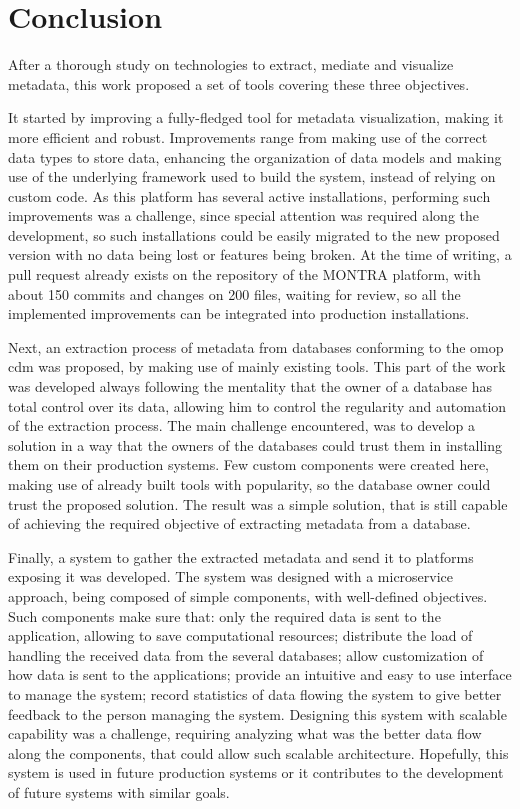 
\chapter{Conclusion}
\label{chapter:conclusion}
After a thorough study on technologies to extract, mediate and visualize metadata, this work proposed a set of tools covering these three objectives.

It started by improving a fully-fledged tool for metadata visualization, making it more efficient and robust.
Improvements range from making use of the correct data types to store data, enhancing the organization of data models and making use of the underlying framework used to build the system, instead of relying on custom code.
As this platform has several active installations, performing such improvements was a challenge, since special attention was required along the development, so such installations could be easily migrated to the new proposed version with no data being lost or features being broken.
At the time of writing, a pull request already exists on the repository of the MONTRA platform, with about 150 commits and changes on 200 files, waiting for review, so all the implemented improvements can be integrated into production installations.

Next, an extraction process of metadata from databases conforming to the \gls{omop} \gls{cdm} was proposed, by making use of mainly existing tools.
This part of the work was developed always following the mentality that the owner of a database has total control over its data, allowing him to control the regularity and automation of the extraction process.
The main challenge encountered, was to develop a solution in a way that the owners of the databases could trust them in installing them on their production systems.
Few custom components were created here, making use of already built tools with popularity, so the database owner could trust the proposed solution.
The result was a simple solution, that is still capable of achieving the required objective of extracting metadata from a database.

Finally, a system to gather the extracted metadata and send it to platforms exposing it was developed.
The system was designed with a microservice approach, being composed of simple components, with well-defined objectives.
Such components make sure that: only the required data is sent to the application, allowing to save computational resources; distribute the load of handling the received data from the several databases; allow customization of how data is sent to the applications; provide an intuitive and easy to use interface to manage the system; record statistics of data flowing the system to give better feedback to the person managing the system.
Designing this system with scalable capability was a challenge, requiring analyzing what was the better data flow along the components, that could allow such scalable architecture.
Hopefully, this system is used in future production systems or it contributes to the development of future systems with similar goals.


